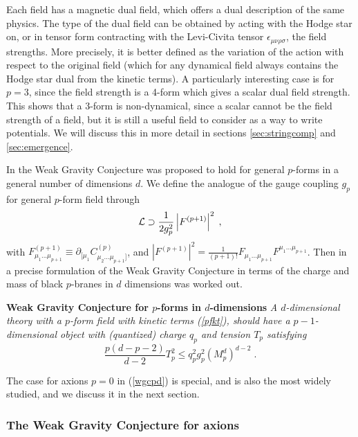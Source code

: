 \documentclass[11pt,a4paper]{article}
\numberwithin{equation}{section}
\numberwithin{table}{section}\setlength{\multlinegap}{25pt}
\newcommand{\be}{\begin{equation}}
\newcommand{\ee}{\end{equation}}
\begin{document}
Each field has a magnetic dual field, which offers a dual description of the same physics. The type of the dual field can be obtained by acting with the Hodge star on, or in tensor form contracting with the Levi-Civita tensor $\epsilon_{\mu\nu\rho\sigma}$, the field strengths. More precisely, it is better defined as the variation of the action with respect to the original field (which for any dynamical field always contains the Hodge star dual from the kinetic terms). A particularly interesting case is for $p=3$, since the field strength is a 4-form which gives a scalar dual field strength. This shows that a 3-form is non-dynamical, since a scalar cannot be the field strength of a field, but it is still a useful field to consider as a way to write potentials. We will discuss this in more detail in sections \ref{sec:stringcomp} and \ref{sec:emergence}.

In \cite{ArkaniHamed:2006dz} the Weak Gravity Conjecture was proposed to hold for general $p$-forms in a general number of dimensions $d$. We define the analogue of the gauge coupling $g_p$ for general $p$-form field through 
\be
\label{pfkt}
{\cal L} \supset \frac{1}{2g_p^2} \left| F^{(p+1)} \right|^2 \;,
\ee
with $F^{(p+1)}_{\mu_1...\mu_{p+1}}\equiv \partial_{[\mu_1}C^{(p)}_{\mu_2...\mu_{p+1}]}$, and $\left| F^{(p+1)} \right|^2=\frac{1}{\left(p+1\right)!} F_{\mu_1...\mu_{p+1}}F^{\mu_1...\mu_{p+1}}$. Then in \cite{Heidenreich:2015nta} a precise formulation of the Weak Gravity Conjecture in terms of the charge and mass of black $p$-branes in $d$ dimensions was worked out.
\begin{tcolorbox}
{\bf Weak Gravity Conjecture for $p$-forms in $d$-dimensions} \;\cite{ArkaniHamed:2006dz,Heidenreich:2015nta}
{\it 
\newline
\newline
A $d$-dimensional theory with a $p$-form field with kinetic terms (\ref{pfkt}), should have a $p-1$-dimensional object with (quantized) charge $q_p$ and tension $T_p$ satisfying 
\be
\label{wgcpd}
\frac{p\left(d-p-2\right)}{d-2} T_p^2 \leq q_p^2 g_p^2 \left(M_p^d\right)^{d-2}\;.
\ee 
}
\end{tcolorbox}

The case for axions $p=0$ in (\ref{wgcpd}) is special, and is also the most widely studied, and we discuss it in the next section. 

\subsubsection{The Weak Gravity Conjecture for axions}
\label{sec:wgcpform}
\end{document}

